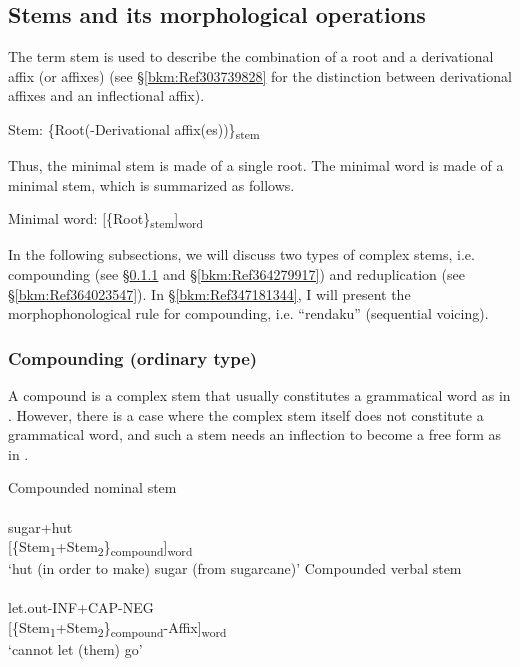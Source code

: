 \subsection{Stems and its morphological operations}\hypertarget{RefHeadingToc395697003}{}\label{bkm:Ref367387017}
The term stem is used to describe the combination of a root and a derivational affix (or affixes) (see §\ref{bkm:Ref303739828} for the distinction between derivational affixes and an inflectional affix).

\ea\label{ex:4.21} Stem: \{Root(-Derivational affix(es))\}\textsubscript{stem}\z

\noindent Thus, the minimal stem is made of a single root. The minimal word is made of a minimal stem, which is summarized as follows.

\ea\label{ex:4.22} Minimal word: [\{Root\}\textsubscript{stem}]\textsubscript{word}\z

In the following subsections, we will discuss two types of complex stems, i.e. compounding (see §\ref{bkm:Ref364023541} and §\ref{bkm:Ref364279917}) and reduplication (see §\ref{bkm:Ref364023547}). In §\ref{bkm:Ref347181344}, I will present the morphophonological rule for compounding, i.e. “rendaku” (sequential voicing).

\subsubsection{Compounding (ordinary type)}
\label{bkm:Ref364023541}\hypertarget{RefHeadingToc395697004}{}\label{bkm:Ref364286741}
A compound is a complex stem that usually constitutes a grammatical word as in . However, there is a case where the complex stem itself does not constitute a grammatical word, and such a stem needs an inflection to become a free form as in .

\ea
\ea \label{ex:4.23a}Compounded nominal stem\\
   \\
   {sugar+hut}\\
   {[\{Stem\textsubscript{1}+Stem\textsubscript{2}\}\textsubscript{compound}]\textsubscript{word}}\\
   \glt ‘hut (in order to make) sugar (from sugarcane)’
\ex \label{ex:4.23b}Compounded verbal stem\\
   \\
   {let.out-INF+CAP-NEG}\\
   {[\{Stem\textsubscript{1}+Stem\textsubscript{2}\}\textsubscript{compound}{}-Affix]\textsubscript{word}}\\
   \glt ‘cannot let (them) go’
\z
\z

